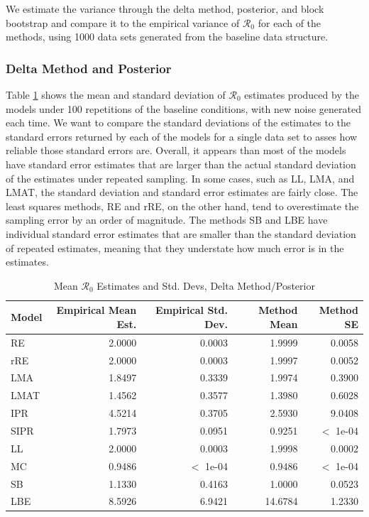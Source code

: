 \documentclass[12pt]{article}
\newcommand{\rr}{\ensuremath{\mathcal{R}_0}}
\begin{document}
We estimate the variance through the delta method, posterior, and  block bootstrap and compare it to the empirical variance of $\rr$ for each of the methods, using 1000 data sets generated from the baseline data structure.

\subsubsection{Delta Method and Posterior}

Table \ref{tab:rep-samp} shows the mean and standard deviation of $\rr$ estimates produced by the models under 100 repetitions of the baseline conditions, with new noise generated each time. We want to compare the standard deviations of the estimates to the standard errors returned by each of the models for a single data set to asses how reliable those standard errors are. Overall, it appears than most of the models have standard error estimates that are larger than the actual standard deviation of the estimates under repeated sampling. In some cases, such as LL, LMA, and LMAT, the standard deviation and standard error estimates are fairly close. The least squares methods, RE and rRE, on the other hand, tend to overestimate the sampling error by an order of magnitude. The methods SB and LBE have individual standard error estimates that are smaller than the standard deviation of repeated estimates, meaning that they understate how much error is in the estimates.


\begin{table}[H]
	
	\centering
	\begin{tabular}[t]{l|r|r|r|r}
		\hline
		Model & Empirical Mean Est. & Empirical Std. Dev. & Method Mean & Method SE\\
		\hline
		RE & 2.0000 & 0.0003 & 1.9999 & 0.0058\\
		\hline
		rRE & 2.0000 & 0.0003 & 1.9997 & 0.0052\\
		\hline
		LMA & 1.8497 & 0.3339 & 1.9974 & 0.3900\\
		\hline
		LMAT & 1.4562 & 0.3577 & 1.3980 & 0.6028 \\
		\hline
		IPR & 4.5214 & 0.3705 & 2.5930 & 9.0408\\
		\hline
		SIPR & 1.7973 & 0.0951 & 0.9251 & $<$ 1e-04 \\
		\hline
		LL & 2.0000 & 0.0003 & 1.9998 & 0.0002\\
		\hline
		MC & 0.9486 & $<$ 1e-04 & 0.9486 & $<$ 1e-04\\
		\hline
		SB & 1.1330 & 0.4163 & 1.0000 & 0.0523\\
		\hline
		LBE & 8.5926 & 6.9421 & 14.6784 & 1.2330\\
		\hline
	\end{tabular}
        \caption{Mean $\rr$ Estimates and Std. Devs, Delta Method/Posterior}
        \label{tab:rep-samp}
\end{table}
\end{document}
